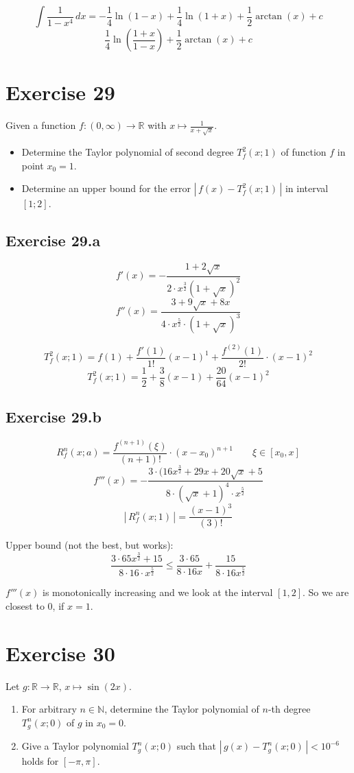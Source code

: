 \documentclass[a4paper]{article}
\theoremstyle{definition}
\newcommand\abs[1]{\left|\,#1\,\right|}
\begin{document}
\[ \int \frac{1}{1 - x^4} \, dx = -\frac14 \ln(1 - x) + \frac14 \ln(1 + x) + \frac{1}{2} \arctan(x) + c \]
\[ \frac14 \ln\left(\frac{1 + x}{1 - x}\right) + \frac12 \arctan(x) + c \]

\section{Exercise 29}
\begin{ex}
  Given a function $f: (0, \infty) \to \mathbb R$ with $x \mapsto \frac{1}{x + \sqrt{x}}$.
  \begin{itemize}
    \item Determine the Taylor polynomial of second degree $T_f^2(x;1)$ of function $f$ in point $x_0 = 1$.
    \item Determine an upper bound for the error $\abs{f(x) - T_f^2(x;1)}$ in interval $[1;2]$.
  \end{itemize}
\end{ex}

\subsection{Exercise 29.a}
\[ f'(x) = -\frac{1 + 2\sqrt{x}}{2 \cdot x^{\frac32} (1 + \sqrt{x})^2} \]
\[ f''(x) = \frac{3 + 9\sqrt{x} + 8x}{4 \cdot x^{\frac52} \cdot (1 + \sqrt{x})^3} \]

\[ T_f^2(x;1) = f(1) + \frac{f'(1)}{1!} (x - 1)^1 + \frac{f^{(2)}(1)}{2!} \cdot (x - 1)^2 \]
\[ T_f^2(x;1) = \frac12 + \frac38 (x - 1) + \frac{20}{64} (x - 1)^2 \]

\subsection{Exercise 29.b}
\[ R_f^n(x;a) = \frac{f^{(n+1)}(\xi)}{(n+1)!} \cdot (x - x_0)^{n+1} \qquad \xi \in [x_0, x] \]
\[ f'''(x) = - \frac{3 \cdot (16 x^{\frac32} + 29x + 20\sqrt{x} + 5}{8 \cdot (\sqrt{x} + 1)^4 \cdot x^{\frac52}} \]
\[ \abs{R_f^n(x;1)} = \frac{(x - 1)^3}{(3)!} \]

Upper bound (not the best, but works):
\[ \frac{3 \cdot 65 x^{\frac32} + 15}{8 \cdot 16 \cdot x^{\frac52}} \leq \frac{3 \cdot 65}{8 \cdot 16x} + \frac{15}{8 \cdot 16x^{\frac52}} \]

$f'''(x)$ is monotonically increasing and we look at the interval $[1,2]$.
So we are closest to $0$, if $x=1$.

\section{Exercise 30}
\begin{ex}
  Let $g: \mathbb R \to \mathbb R$, $x \mapsto \sin(2x)$.
  \begin{enumerate}
    \item For arbitrary $n \in \mathbb N$, determine the Taylor polynomial of $n$-th degree
      $T_g^n(x;0)$ of $g$ in $x_0 = 0$.
    \item Give a Taylor polynomial $T_g^n(x; 0)$ such that $\abs{g(x) - T_g^n(x; 0)} < 10^{-6}$
      holds for $[-\pi,\pi]$.
  \end{enumerate}
\end{ex}
\end{document}
